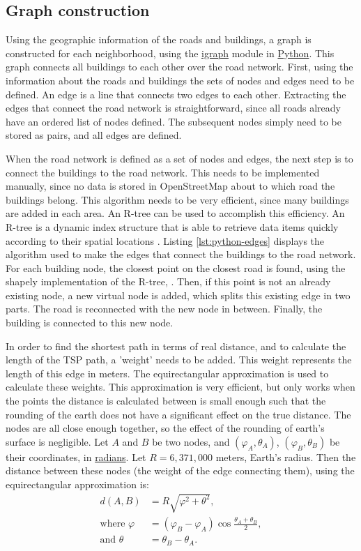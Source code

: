 \subsection{Graph construction}
Using the geographic information of the roads and buildings, a graph
is constructed for each neighborhood, using the \url{igraph} module in \url{Python}. This graph
connects all buildings to each other over the road network. First, using the information about the
roads and buildings the sets of nodes and edges need to be defined. An edge is a line that connects
two edges to each other. Extracting the edges that connect the road network is straightforward,
since all roads already have an ordered list of nodes defined. The subsequent nodes simply need to
be stored as pairs, and all edges are defined.

When the road network is defined as a set of nodes and edges, the next step is to connect the buildings
to the road network. This needs to be implemented manually, since no data is stored in OpenStreetMap
about to which road the buildings belong. This algorithm needs to be very efficient, since many
buildings are added in each area. An R-tree can be used to accomplish this efficiency.
An R-tree is a dynamic index structure that is able to retrieve data items quickly according to
their spatial locations \citep{guttman1984r}. Listing \ref{lst:python-edges} displays the algorithm
used to make the edges that connect the buildings to the road network. For each building node,
the closest point on the closest road is found, using the shapely implementation of the R-tree,
. Then, if this point is not an already existing node, a new virtual node is added,
which splits this existing edge in two parts. The road is reconnected with the new node in between.
Finally, the building is connected to this new node.

In order to find the shortest path in terms of real distance, and to calculate the length of the
TSP path, a 'weight' needs to be added. This weight represents the length of this edge in meters.
The equirectangular approximation is used to calculate these weights. This approximation is very
efficient, but only works when the points the distance is calculated between is small enough such
that the rounding of the earth does not have a significant effect on the true distance.
The nodes are all close enough together, so the effect of the
rounding of earth's surface is negligible. Let $A$ and $B$ be two nodes,
and $(\varphi_A,\theta_A)$, $(\varphi_B,\theta_B)$ be their coordinates, in \url{radians}. Let $R=6,371,000$ meters,
Earth's radius. Then the distance between these nodes (the weight of the edge connecting them),
using the equirectangular approximation is:
\begin{align}
	\label{eq:equirectangluar_approx}
	d(A,B)               & =R\sqrt{\varphi^2+\theta^2},                             \\
	\text{where }\varphi & =(\varphi_B-\varphi_A)\cos{\frac{\theta_A+\theta_B}{2}}, \\
	\text{and }\theta    & =\theta_B-\theta_A.
\end{align}

